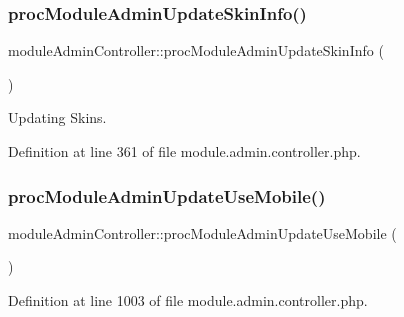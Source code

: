 \subsubsection{\texorpdfstring{proc\+Module\+Admin\+Update\+Skin\+Info()}{procModuleAdminUpdateSkinInfo()}}
{\footnotesize\ttfamily module\+Admin\+Controller\+::proc\+Module\+Admin\+Update\+Skin\+Info (\begin{DoxyParamCaption}{ }\end{DoxyParamCaption})}



Updating Skins. 



Definition at line 361 of file module.\+admin.\+controller.\+php.

\mbox{\label{classmoduleAdminController_a70143beac165b7795868db95f0d4b4e6}} 
\subsubsection{\texorpdfstring{proc\+Module\+Admin\+Update\+Use\+Mobile()}{procModuleAdminUpdateUseMobile()}}
{\footnotesize\ttfamily module\+Admin\+Controller\+::proc\+Module\+Admin\+Update\+Use\+Mobile (\begin{DoxyParamCaption}{ }\end{DoxyParamCaption})}



Definition at line 1003 of file module.\+admin.\+controller.\+php.

\mbox{\label{classmoduleAdminController_a1ff90fe08fe1f3d67783ff81b91ee3b2}} 
